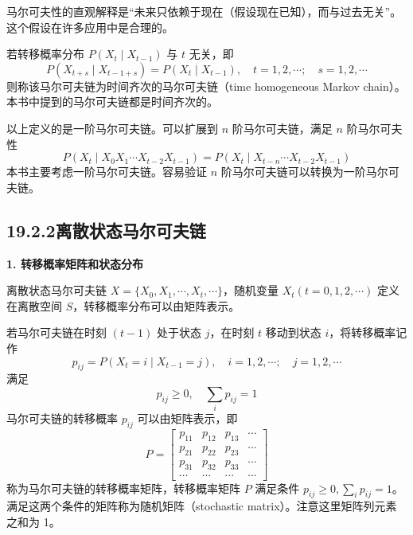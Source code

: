\documentclass[UTF8, 12pt, fontset=fandol, oneside]{ctexart}
\begin{document}
马尔可夫性的直观解释是“未来只依赖于现在（假设现在已知），而与过去无关”。这个假设在许多应用中是合理的。

若转移概率分布 $P(X_t\mid X_{t-1})$ 与 $t$ 无关，即
\begin{equation}
P(X_{t+s}\mid X_{t-1+s})=P(X_t\mid X_{t-1}),\quad t=1,2,\cdots;\quad s=1,2,\cdots
\tag{19.7}
\end{equation}
则称该马尔可夫链为时间齐次的马尔可夫链（time homogeneous Markov chain）。本书中提到的马尔可夫链都是时间齐次的。

以上定义的是一阶马尔可夫链。可以扩展到 $n$ 阶马尔可夫链，满足 $n$ 阶马尔可夫性
\begin{equation}
P(X_t\mid X_0X_1\cdots X_{t-2}X_{t-1})=P(X_t\mid X_{t-n}\cdots X_{t-2}X_{t-1})
\tag{19.8}
\end{equation}
本书主要考虑一阶马尔可夫链。容易验证 $n$ 阶马尔可夫链可以转换为一阶马尔可夫链。

\subsection*{19.2.2\quad 离散状态马尔可夫链}

\noindent\textbf{1. 转移概率矩阵和状态分布}

离散状态马尔可夫链 $X=\{X_0,X_1,\cdots,X_t,\cdots\}$，随机变量 $X_t(t=0,1,2,\cdots)$ 定义在离散空间 $S$，转移概率分布可以由矩阵表示。

若马尔可夫链在时刻 $(t-1)$ 处于状态 $j$，在时刻 $t$ 移动到状态 $i$，将转移概率记作
\begin{equation}
p_{ij}=P(X_t=i\mid X_{t-1}=j),\quad i=1,2,\cdots;\quad j=1,2,\cdots
\tag{19.9}
\end{equation}
满足
\[
p_{ij}\geqslant 0,\quad \sum_i p_{ij}=1
\]
马尔可夫链的转移概率 $p_{ij}$ 可以由矩阵表示，即
\begin{equation}
P=
\begin{bmatrix}
p_{11} & p_{12} & p_{13} & \cdots\\
p_{21} & p_{22} & p_{23} & \cdots\\
p_{31} & p_{32} & p_{33} & \cdots\\
\cdots & \cdots & \cdots & \cdots
\end{bmatrix}
\tag{19.10}
\end{equation}
称为马尔可夫链的转移概率矩阵，转移概率矩阵 $P$ 满足条件 $p_{ij}\geqslant 0,\sum_i p_{ij}=1$。满足这两个条件的矩阵称为随机矩阵（stochastic matrix）。注意这里矩阵列元素之和为 1。
\end{document}
